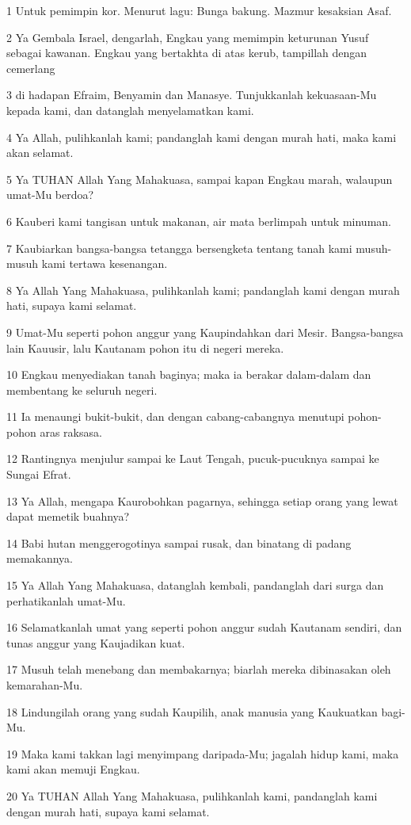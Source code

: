 \par 1 Untuk pemimpin kor. Menurut lagu: Bunga bakung. Mazmur kesaksian Asaf.
\par 2 Ya Gembala Israel, dengarlah, Engkau yang memimpin keturunan Yusuf sebagai kawanan. Engkau yang bertakhta di atas kerub, tampillah dengan cemerlang
\par 3 di hadapan Efraim, Benyamin dan Manasye. Tunjukkanlah kekuasaan-Mu kepada kami, dan datanglah menyelamatkan kami.
\par 4 Ya Allah, pulihkanlah kami; pandanglah kami dengan murah hati, maka kami akan selamat.
\par 5 Ya TUHAN Allah Yang Mahakuasa, sampai kapan Engkau marah, walaupun umat-Mu berdoa?
\par 6 Kauberi kami tangisan untuk makanan, air mata berlimpah untuk minuman.
\par 7 Kaubiarkan bangsa-bangsa tetangga bersengketa tentang tanah kami musuh-musuh kami tertawa kesenangan.
\par 8 Ya Allah Yang Mahakuasa, pulihkanlah kami; pandanglah kami dengan murah hati, supaya kami selamat.
\par 9 Umat-Mu seperti pohon anggur yang Kaupindahkan dari Mesir. Bangsa-bangsa lain Kauusir, lalu Kautanam pohon itu di negeri mereka.
\par 10 Engkau menyediakan tanah baginya; maka ia berakar dalam-dalam dan membentang ke seluruh negeri.
\par 11 Ia menaungi bukit-bukit, dan dengan cabang-cabangnya menutupi pohon-pohon aras raksasa.
\par 12 Rantingnya menjulur sampai ke Laut Tengah, pucuk-pucuknya sampai ke Sungai Efrat.
\par 13 Ya Allah, mengapa Kaurobohkan pagarnya, sehingga setiap orang yang lewat dapat memetik buahnya?
\par 14 Babi hutan menggerogotinya sampai rusak, dan binatang di padang memakannya.
\par 15 Ya Allah Yang Mahakuasa, datanglah kembali, pandanglah dari surga dan perhatikanlah umat-Mu.
\par 16 Selamatkanlah umat yang seperti pohon anggur sudah Kautanam sendiri, dan tunas anggur yang Kaujadikan kuat.
\par 17 Musuh telah menebang dan membakarnya; biarlah mereka dibinasakan oleh kemarahan-Mu.
\par 18 Lindungilah orang yang sudah Kaupilih, anak manusia yang Kaukuatkan bagi-Mu.
\par 19 Maka kami takkan lagi menyimpang daripada-Mu; jagalah hidup kami, maka kami akan memuji Engkau.
\par 20 Ya TUHAN Allah Yang Mahakuasa, pulihkanlah kami, pandanglah kami dengan murah hati, supaya kami selamat.


